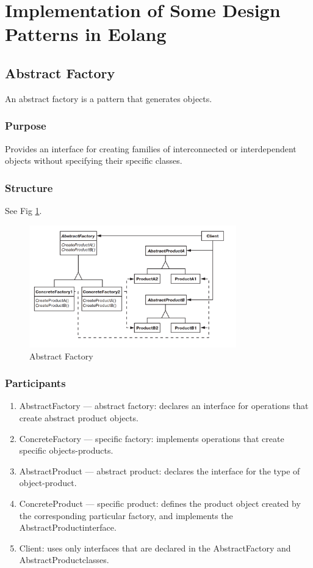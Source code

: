 \documentclass[sigplan,12pt,nonacm=true,review=false]{acmart}
\begin{document}
\section{Implementation of Some Design Patterns in Eolang}
\subsection{Abstract Factory}
An abstract factory is a pattern that generates objects.

\subsubsection{Purpose}
Provides an interface for creating families of interconnected or interdependent objects without specifying their specific classes.

\subsubsection{Structure}
See Fig \ref{fig:5}.
\begin{figure}[!t]
  \includegraphics[width=0.8\textwidth]{eolang/tr-02/assets/Picture5.png}
  \caption{Abstract Factory}
  \label{fig:5}
\end{figure}

\subsubsection{Participants}
\begin{enumerate}
    \item AbstractFactory — abstract factory: declares an interface for operations that create abstract product objects.
    \item ConcreteFactory — specific factory: implements operations that create specific objects-products.
    \item AbstractProduct — abstract product: declares the interface for the type of object-product.
    \item ConcreteProduct — specific product: defines the product object created by the corresponding particular factory, and implements the AbstractProductinterface.
    \item Client: uses only interfaces that are declared in the AbstractFactory and  AbstractProductclasses.
\end{enumerate}
\end{document}
